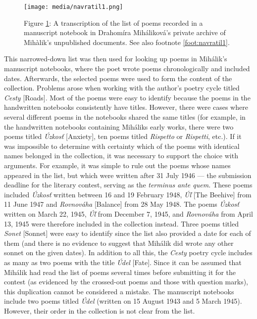 \documentclass{article}
\begin{document}
  \begin{figure}
    \centering
    \texttt{[image: media/navratil1.png]}
    \caption{Figure \ref{fig:navratil1}: A transcription of the list of poems recorded in a manuscript notebook in Drahomíra Miháliková's private archive of Mihàlik's unpublished documents. See also footnote \ref{foot:navratil1}.}
    \label{fig:navratil1}
  \end{figure}


This narrowed-down list was then used for looking up poems in Mihálik's
manuscript notebooks, where the poet wrote poems chronologically and
included dates. Afterwards, the selected poems were used to form the
content of the collection. Problems arose when working with the author's
poetry cycle titled \emph{Cesty} [Roads]. Most of the poems were easy to
identify because the poems in the handwritten notebooks consistently
have titles. However, there were cases where several different poems in
the notebooks shared the same titles (for example, in the handwritten
notebooks containing Mihálik\textquotesingle s early works, there were
two poems titled \emph{Úzkosť} [Anxiety], ten poems titled
\emph{Rispetto} or \emph{Rispetti}, etc.). If it was impossible to
determine with certainty which of the poems with identical names
belonged in the collection, it was necessary to support the choice with
arguments. For example, it was simple to rule out the poems whose names appeared in
the list, but which were written after 31 July 1946 –– the submission
deadline for the literary contest, serving as the \emph{terminus ante
quem.} These poems included \emph{Úzkosť} written between 16
and 19 February 1948, \emph{Úľ} [The Beehive] from 11 June 1947 and
\emph{Rovnováha} [Balance] from 28 May 1948. The poems \emph{Úzkosť}
written on March 22, 1945, \emph{Úľ} from December 7, 1945, and
\emph{Rovnováha} from April 13, 1945 were therefore included in the collection instead. Three poems
titled \emph{Sonet} [Sonnet] were easy to identify since the list also
provided a date for each of them (and there is no evidence to suggest that Mihálik did wrote any other
sonnet on the given dates). In addition to all this, the \emph{Cesty}
poetry cycle includes as many as two poems with the title \emph{Údel}
[Fate]. Since it can be assumed that Mihálik had read the list of poems
several times before submitting it for the contest (as evidenced by the
crossed-out poems and those with question marks), this duplication
cannot be considered a mistake. The manuscript notebooks include two
poems titled \emph{Údel} (written on 15 August 1943 and 5 March 1945).
However, their order in the collection is not clear from the list.
  
\end{document}

